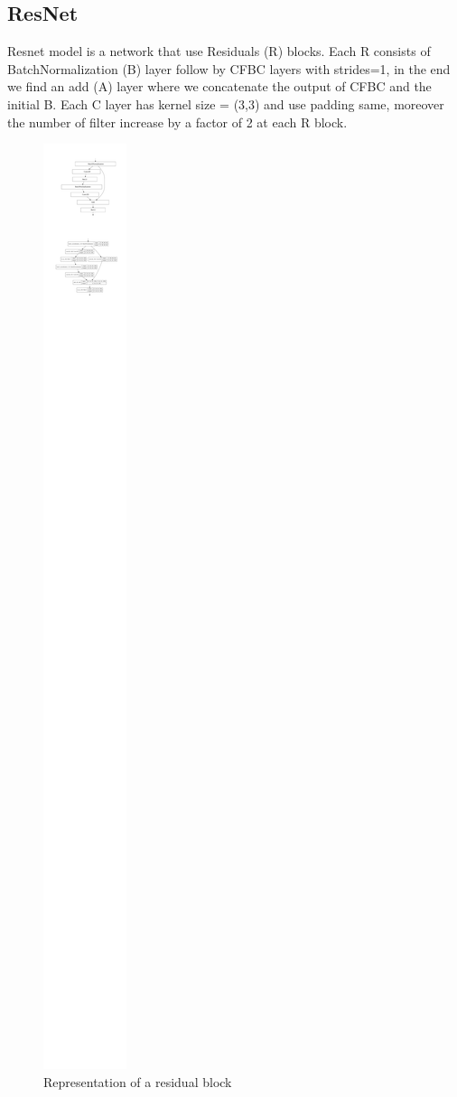\documentclass[10pt,twocolumn,letterpaper]{article}
\begin{document}
\subsection{ResNet}
\label{subsection:ResNet}
Resnet model is a network that use Residuals (R) blocks. Each R consists of BatchNormalization (B) layer follow by CFBC layers with strides=1, in the end we find an add (A) layer where we concatenate the output of CFBC and the initial B. Each C layer has kernel size = (3,3) and use padding same, moreover the number of filter increase by a factor of 2 at each R block.
\begin{figure}[H]
   \centering
   \includegraphics[width=0.7\linewidth]{./immagini/residual_block.pdf}
   \caption{Representation of a residual block}
\end{figure}
\end{document}
